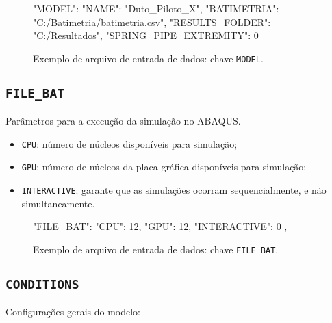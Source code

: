 \begin{figure}
\caption{Exemplo de arquivo de entrada de dados: chave \texttt{MODEL}.}\label{lst:model}
\begin{jsoncode}
{
  "MODEL": {
    "NAME": "Duto_Piloto_X",
    "BATIMETRIA": "C:/Batimetria/batimetria.csv",
    "RESULTS_FOLDER": "C:/Resultados",
    "SPRING_PIPE_EXTREMITY": 0
  }
}
\end{jsoncode}
\end{figure}

\subsection{\texttt{FILE\_BAT}}

Parâmetros para a execução da simulação no ABAQUS.

\begin{itemize}
  \item \texttt{CPU}: número de núcleos disponíveis para simulação;
  \item \texttt{GPU}: número de núcleos da placa gráfica disponíveis para simulação;
  \item \texttt{INTERACTIVE}: garante que as simulações ocorram sequencialmente, e não simultaneamente.
\end{itemize}

\begin{figure}
\caption{Exemplo de arquivo de entrada de dados: chave \texttt{FILE\_BAT}.\label{lst:file_bat}}
\begin{jsoncode}
{
  "FILE_BAT": {
    "CPU": 12,
    "GPU": 12,
    "INTERACTIVE": 0
  },
}
\end{jsoncode}
\end{figure}

\subsection{\texttt{CONDITIONS}}

Configurações gerais do modelo:

